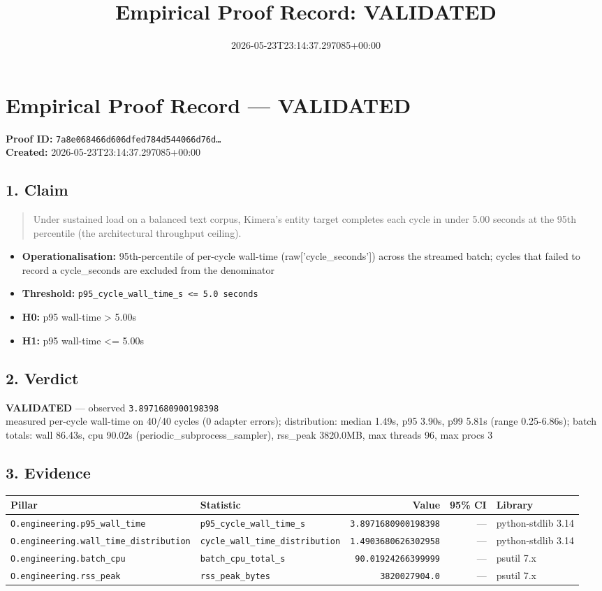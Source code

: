 \documentclass{article}
\title{Empirical Proof Record: VALIDATED}
\date{2026-05-23T23:14:37.297085+00:00}
\begin{document}
\maketitle
\section*{Empirical Proof Record --- \textcolor{validated}{\textbf{VALIDATED}}}
\textbf{Proof ID:} \texttt{7a8e068466d606dfed784d544066d76d\dots}\\
\textbf{Created:} 2026-05-23T23:14:37.297085+00:00
\subsection*{1. Claim}
\begin{quote}Under sustained load on a balanced text corpus, Kimera's entity target completes each cycle in under 5.00 seconds at the 95th percentile (the architectural throughput ceiling).\end{quote}
\begin{itemize}
\item \textbf{Operationalisation:} 95th-percentile of per-cycle wall-time (raw['cycle\_seconds']) across the streamed batch; cycles that failed to record a cycle\_seconds are excluded from the denominator
\item \textbf{Threshold:} \texttt{p95\_cycle\_wall\_time\_s <= 5.0 seconds}
\item \textbf{H0:} p95 wall-time > 5.00s
\item \textbf{H1:} p95 wall-time <= 5.00s
\end{itemize}
\subsection*{2. Verdict}
\textcolor{validated}{\textbf{VALIDATED}} --- observed \texttt{3.8971680900198398}\\
measured per-cycle wall-time on 40/40 cycles (0 adapter errors); distribution: median 1.49s, p95 3.90s, p99 5.81s (range 0.25-6.86s); batch totals: wall 86.43s, cpu 90.02s (periodic\_subprocess\_sampler), rss\_peak 3820.0MB, max threads 96, max procs 3
\subsection*{3. Evidence}
\begin{tabular}{llrrl}\toprule
\textbf{Pillar} & \textbf{Statistic} & \textbf{Value} & \textbf{95\% CI} & \textbf{Library} \\\midrule
\texttt{O.engineering.p95\_wall\_time} & \texttt{p95\_cycle\_wall\_time\_s} & \texttt{3.8971680900198398} & --- & python-stdlib 3.14 \\
\texttt{O.engineering.wall\_time\_distribution} & \texttt{cycle\_wall\_time\_distribution} & \texttt{1.4903680626302958} & --- & python-stdlib 3.14 \\
\texttt{O.engineering.batch\_cpu} & \texttt{batch\_cpu\_total\_s} & \texttt{90.01924266399999} & --- & psutil 7.x \\
\texttt{O.engineering.rss\_peak} & \texttt{rss\_peak\_bytes} & \texttt{3820027904.0} & --- & psutil 7.x \\
\bottomrule\end{tabular}
\end{document}
